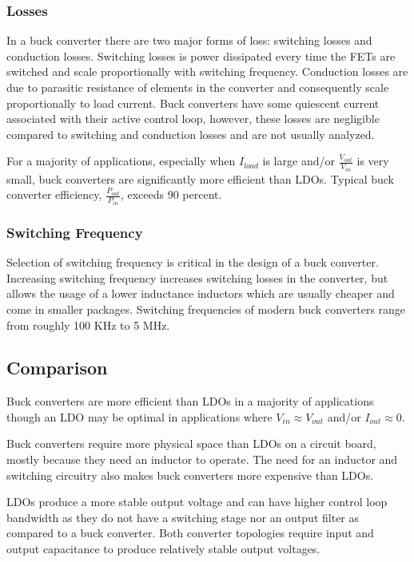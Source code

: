 \documentclass[main.tex]{subfiles}
\begin{document}

\subsubsection{Losses}
In a buck converter there are two major forms of loss: switching losses and conduction losses. Switching losses is power dissipated every time the FETs are switched and scale proportionally with switching frequency. Conduction losses are due to parasitic resistance of elements in the converter and consequently scale proportionally to load current. Buck converters have some quiescent current associated with their active control loop, however, these losses are negligible compared to switching and conduction losses and are not usually analyzed. 

For a majority of applications, especially when $I_{load}$ is large and/or $\frac{V_{out}}{V_{in}}$ is very small, buck converters are significantly more efficient than LDOs. Typical buck converter efficiency, $\frac{P_{out}}{P_{in}}$, exceeds 90 percent.  

\subsubsection{Switching Frequency}
Selection of switching frequency is critical in the design of a buck converter. Increasing switching frequency increases switching losses in the converter, but allows the usage of a lower inductance inductors which are usually cheaper and come in smaller packages. Switching frequencies of modern buck converters range from roughly 100 KHz to 5 MHz. 

\subsection{Comparison}
Buck converters are more efficient than LDOs in a majority of applications though an LDO may be optimal in applications where $V_{in} \approx V_{out}$ and/or $I_{out} \approx 0$. 

Buck converters require more physical space than LDOs on a circuit board, mostly because they need an inductor to operate. The need for an inductor and switching circuitry also makes buck converters more expensive than LDOs. 

LDOs produce a more stable output voltage and can have higher control loop bandwidth as they do not have a switching stage nor an output filter as compared to a buck converter. Both converter topologies require input and output capacitance to produce relatively stable output voltages.
\end{document}
